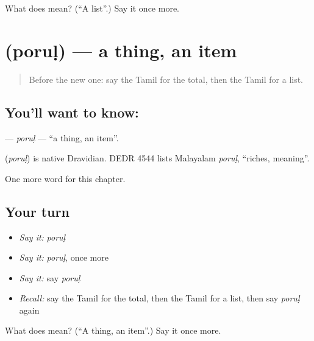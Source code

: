 \begin{tcolorbox}[breakable,colback=teal!4,colframe=teal!35!black,title={Before you move on}]
What does  mean? (\textquotedblleft{}A list\textquotedblright{}.) Say it once more.
\end{tcolorbox}
\section[\texorpdfstring{\ta{பொருள்} (poruḷ)}{பொருள் (poruḷ)}]{ (poruḷ) — a thing, an item}

\label{lesson:TA-C251-porul}



\begin{quote}
Before the new one: say the Tamil for the total, then the Tamil for a list.
\end{quote}

\subsection*{You'll want to know: }
\textbf{} — \emph{poruḷ} — \textquotedblleft{}a thing, an item\textquotedblright{}.

\begin{cousinweb}
\textbf{} (\emph{poruḷ}) is native Dravidian. DEDR 4544 lists Malayalam \emph{poruḷ}, \textquotedblleft{}riches, meaning\textquotedblright{}.
\end{cousinweb}

\begin{grammarlens}[title={What you've built}]
One more word for this chapter.
\end{grammarlens}

\subsection*{Your turn}
\begin{itemize}
\raggedright
  \item \emph{Say it:} \emph{poruḷ}
  \item \emph{Say it:} \emph{poruḷ}, once more
  \item \emph{Say it:} say \emph{poruḷ}
  \item \emph{Recall:} say the Tamil for the total, then the Tamil for a list, then say \emph{poruḷ} again
\end{itemize}

\begin{tcolorbox}[breakable,colback=teal!4,colframe=teal!35!black,title={Before you move on}]
What does  mean? (\textquotedblleft{}A thing, an item\textquotedblright{}.) Say it once more.
\end{tcolorbox}
